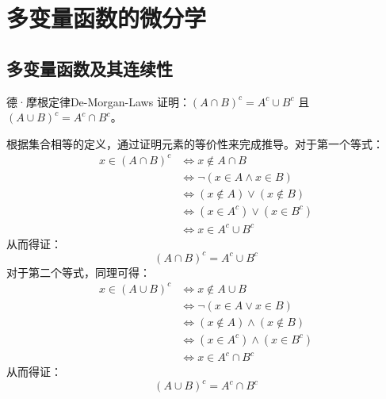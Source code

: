 \chapter{多变量函数的微分学}


\section{多变量函数及其连续性}

\begin{problem}{德·摩根定律}{De-Morgan-Laws}
    证明：$(A \cap B)^c = A^c \cup B^c$ 且 $(A \cup B)^c = A^c \cap B^c$。
\end{problem}

\begin{myproof}
    根据集合相等的定义，通过证明元素的等价性来完成推导。对于第一个等式：
    \begin{equation*}
        \begin{aligned}
            x \in (A \cap B)^c & \iff x \notin A \cap B              \\
                               & \iff \neg (x \in A \land x \in B)   \\
                               & \iff (x \notin A) \lor (x \notin B) \\
                               & \iff (x \in A^c) \lor (x \in B^c)   \\
                               & \iff x \in A^c \cup B^c
        \end{aligned}
    \end{equation*}
    从而得证：
    \begin{equation*}
        \boxed{(A \cap B)^c = A^c \cup B^c}
    \end{equation*}
    对于第二个等式，同理可得：
    \begin{equation*}
        \begin{aligned}
            x \in (A \cup B)^c & \iff x \notin A \cup B               \\
                               & \iff \neg (x \in A \lor x \in B)     \\
                               & \iff (x \notin A) \land (x \notin B) \\
                               & \iff (x \in A^c) \land (x \in B^c)   \\
                               & \iff x \in A^c \cap B^c
        \end{aligned}
    \end{equation*}
    从而得证：
    \begin{equation*}
        \boxed{(A \cup B)^c = A^c \cap B^c}
    \end{equation*}
\end{myproof}


